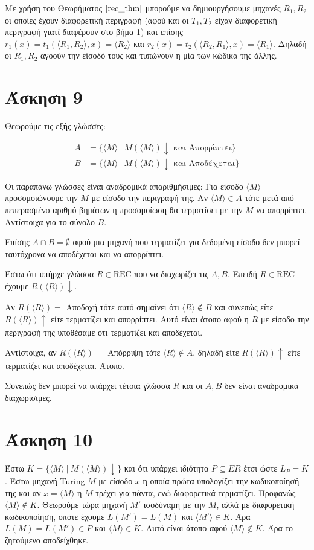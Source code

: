\documentclass[a4paper, oneside, 11pt]{article}
\theoremstyle{definition}
\begin{document}
Με χρήση του Θεωρήματος $\ref{rec_thm}$ μπορούμε να δημιουργήσουμε μηχανές $R_1,
R_2$ οι οποίες έχουν διαφορετική περιγραφή (αφού και οι $T_1, T_2$ είχαν
διαφορετική περιγραφή γιατί διαφέρουν στο βήμα 1) και επίσης $r_1(x) =
t_1(\langle R_1, R_2 \rangle, x) = \langle R_2 \rangle$ και $r_2(x) =
t_2(\langle R_2, R_1 \rangle, x) = \langle R_1 \rangle$.
Δηλαδή οι $R_1, R_2$ αγοούν την είσοδό τους και τυπώνουν η μία των κώδικα της
άλλης.

\section*{Άσκηση 9}

Θεωρούμε τις εξής γλώσσες:

\begin{align*}
A &= \{ \langle M \rangle\ |\ M(\langle M \rangle) \downarrow \text{ και
   Απορρίπτει} \}\\
B &= \{ \langle M \rangle\ |\ M(\langle M \rangle) \downarrow \text{ και
   Αποδέχεται} \}
\end{align*}

Οι παραπάνω γλώσσες είναι αναδρομικά απαριθμήσιμες: Για είσοδο $\langle M
\rangle$ προσομοιώνουμε την $M$ με είσοδο την περιγραφή της. Αν $\langle M
\rangle \in A$ τότε μετά από πεπερασμένο αριθμό βημάτων η προσομοίωση θα
τερματίσει με την $M$ να απορρίπτει. Αντίστοιχα για το σύνολο $B$.

Επίσης $A \cap B = \emptyset$ αφού μια μηχανή που τερματίζει για δεδομένη είσοδο
δεν μπορεί ταυτόχρονα να αποδέχεται και να απορρίπτει.

Έστω ότι υπήρχε γλώσσα $R \in \text{REC}$ που να διαχωρίζει τις $A, B$.
Επειδή $R \in \text{REC}$ έχουμε $R(\langle R \rangle) \downarrow$.

Αν $R(\langle R \rangle) = $ Αποδοχή τότε αυτό σημαίνει ότι $\langle R \rangle
\notin B$ και συνεπώς είτε $R(\langle R \rangle) \uparrow$ είτε τερματίζει και
απορρίπτει. Αυτό είναι άτοπο αφού η $R$ με είσοδο την περιγραφή της υποθέσαμε
ότι τερματίζει και αποδέχεται.

Αντίστοιχα, αν $R(\langle R \rangle) = $ Απόρριψη τότε $\langle R \rangle \notin
A$, δηλαδή είτε $R(\langle R \rangle) \uparrow$ είτε τερματίζει και αποδέχεται.
Άτοπο.

Συνεπώς δεν μπορεί να υπάρχει τέτοια γλώσσα $R$ και οι $A, B$ δεν είναι
αναδρομικά διαχωρίσιμες.

\section*{Άσκηση 10}
Έστω $K=\{\langle M\rangle\ |\ M(\langle M\rangle)\downarrow \}$ και ότι υπάρχει ιδιότητα $P\subseteq ER$ έτσι ώστε $L_P = K$. Έστω μηχανή Turing $Μ$ με είσοδο $x$
η οποία πρώτα υπολογίζει την κωδικοποίησή της και αν $x=\langle M\rangle$ η $M$ τρέχει για πάντα, ενώ διαφορετικά τερματίζει. Προφανώς $\langle M\rangle\notin K$.
Θεωρούμε τώρα μηχανή $M'$ ισοδύναμη με την $M$, αλλά με διαφορετική κωδικοποίηση, οπότε έχουμε $L(M')=L(M)$ και $\langle M'\rangle \in K$. 
Άρα $L(M)=L(M')\in P$ και $\langle M\rangle \in K$. 
Αυτό είναι
άτοπο αφού $\langle M\rangle\notin K$. Άρα το ζητούμενο αποδείχθηκε.
\end{document}
